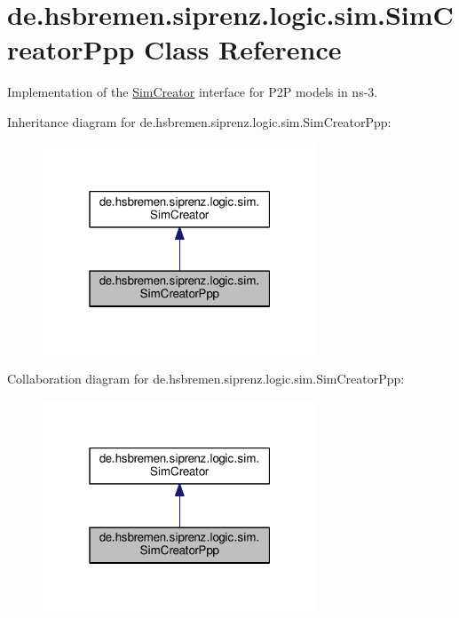\hypertarget{classde_1_1hsbremen_1_1siprenz_1_1logic_1_1sim_1_1SimCreatorPpp}{}\section{de.\+hsbremen.\+siprenz.\+logic.\+sim.\+Sim\+Creator\+Ppp Class Reference}
\label{classde_1_1hsbremen_1_1siprenz_1_1logic_1_1sim_1_1SimCreatorPpp}


Implementation of the \hyperlink{interfacede_1_1hsbremen_1_1siprenz_1_1logic_1_1sim_1_1SimCreator}{Sim\+Creator} interface for P2P models in ns-\/3.  




Inheritance diagram for de.\+hsbremen.\+siprenz.\+logic.\+sim.\+Sim\+Creator\+Ppp\+:\nopagebreak
\begin{figure}[H]
\begin{center}
\leavevmode
\includegraphics[width=232pt]{classde_1_1hsbremen_1_1siprenz_1_1logic_1_1sim_1_1SimCreatorPpp__inherit__graph}
\end{center}
\end{figure}


Collaboration diagram for de.\+hsbremen.\+siprenz.\+logic.\+sim.\+Sim\+Creator\+Ppp\+:\nopagebreak
\begin{figure}[H]
\begin{center}
\leavevmode
\includegraphics[width=232pt]{classde_1_1hsbremen_1_1siprenz_1_1logic_1_1sim_1_1SimCreatorPpp__coll__graph}
\end{center}
\end{figure}
